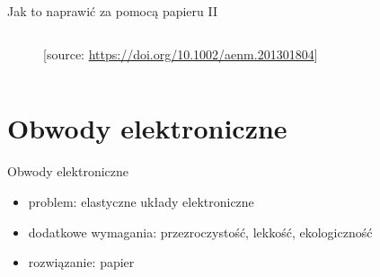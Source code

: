 \documentclass{beamer}
\begin{document}
\begin{frame}{Jak to naprawić za pomocą papieru II}
\begin{figure}[h]
\begin{columns}
\begin{column}{0.35\textwidth}
{        %
         \typeout{}
	        [source: \url{https://doi.org/10.1002/aenm.201301804}]
         }
        \typeout{}
                        \end{column}
        \end{columns}
    \end{figure}
\end{frame}


\section{Obwody elektroniczne}

\begin{frame}{Obwody elektroniczne}

\begin{itemize}
\item problem: elastyczne układy elektroniczne
\item dodatkowe wymagania: przezroczystość, lekkość, ekologiczność
\item rozwiązanie: papier
\end{itemize}
    
\end{frame}
\end{document}
